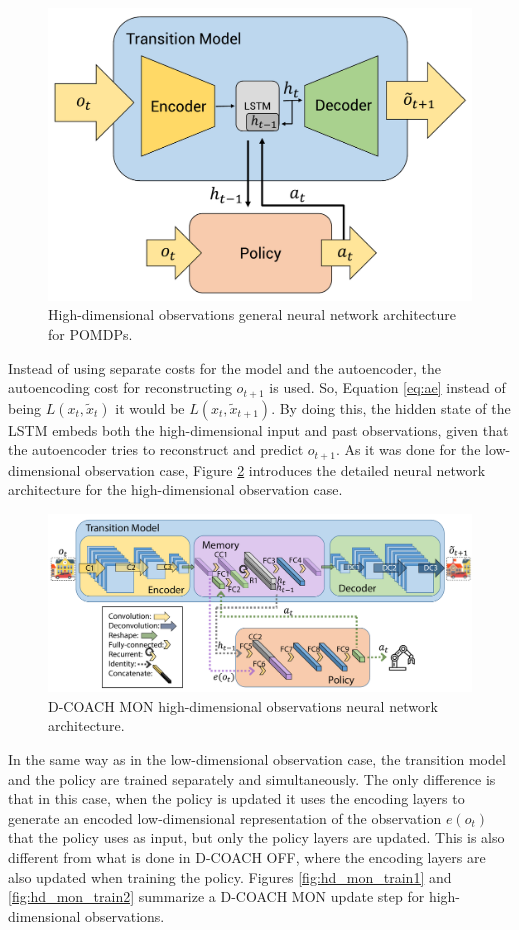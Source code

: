 \begin{figure}[h]
    \centering
    \includegraphics[width=0.5\linewidth]{imagenes/cap4/hd_model.pdf}
    \caption{High-dimensional observations general neural network architecture for POMDPs.}
    \label{fig:rnn_hd}
\end{figure}

Instead of using separate costs for the model and the autoencoder, the autoencoding cost for reconstructing $o_{t+1}$ is used. So, Equation \ref{eq:ae} instead of being $L(x_{t},\widetilde x_{t})$ it would be  $L(x_{t},\widetilde x_{t+1})$. By doing this, the hidden state of the LSTM embeds both the high-dimensional input and past observations, given that the autoencoder tries to reconstruct and predict $o_{t+1}$. As it was done for the low-dimensional observation case, Figure \ref{fig:detailed_hd} introduces the detailed neural network architecture for the high-dimensional observation case.

\begin{figure}[h]
    \centering
    \includegraphics[width=\linewidth]{imagenes/cap4/hd_model_det.pdf}
    \caption{D-COACH MON high-dimensional observations neural network architecture.}
    \label{fig:detailed_hd}
\end{figure}

In the same way as in the low-dimensional observation case, the transition model and the policy are trained separately and simultaneously. The only difference is that in this case, when the policy is updated it uses the encoding layers to generate an encoded low-dimensional representation of the observation $e(o_{t})$ that the policy uses as input, but only the policy layers are updated. This is also different from what is done in D-COACH OFF, where the encoding layers are also updated when training the policy. Figures \ref{fig:hd_mon_train1} and \ref{fig:hd_mon_train2} summarize a D-COACH MON update step for high-dimensional observations.

